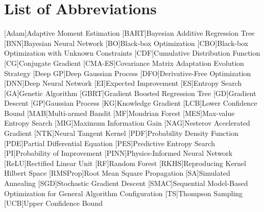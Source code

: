 \chapter*{List of Abbreviations}
{}
\begin{acronym}
        [Adam]{Adaptive Moment Estimation}
        [BART]{Bayesian Additive Regression Tree}
        [BNN]{Bayesian Neural Network}
        [BO]{Black-box Optimization}
        [CBO]{Black-box Optimization with Unknown Constraints}
        [CDF]{Cumulative Distribution Function}
        [CG]{Conjugate Gradient}
        [CMA-ES]{Covariance Matrix Adaptation Evolution Strategy}
        [Deep GP]{Deep Gaussian Process}
        [DFO]{Derivative-Free Optimization}
        [DNN]{Deep Neural Network}
        [EI]{Expected Improvement}
        [ES]{Entropy Search}
        [GA]{Genetic Algorithm}
        [GBRT]{Gradient Boosted Regression Tree}
        [GD]{Gradient Descent}
        [GP]{Gaussian Process}
        [KG]{Knowledge Gradient}
        [LCB]{Lower Confidence Bound}
        [MAB]{Multi-armed Bandit}
        [MF]{Mondrian Forest}
        [MES]{Max-value Entropy Search}
        [MIG]{Maximum Information Gain}
        [NAG]{Nesterov Accelerated Gradient}
        [NTK]{Neural Tangent Kernel}
        [PDF]{Probability Density Function}
        [PDE]{Partial Differential Equation}
        [PES]{Predictive Entropy Search}
        [PI]{Probability of Improvement}
        [PINN]{Physics-Informed Neural Network}
        [ReLU]{Rectified Linear Unit}
        [RF]{Random Forest}
        [RKHS]{Reproducing Kernel Hilbert Space}
        [RMSProp]{Root Mean Square Propagation}
        [SA]{Simulated Annealing}
        [SGD]{Stochastic Gradient Descent}
        [SMAC]{Sequential Model-Based Optimization for General Algorithm Configuration}
        [TS]{Thompson Sampling}
        [UCB]{Upper Confidence Bound}
\end{acronym}

